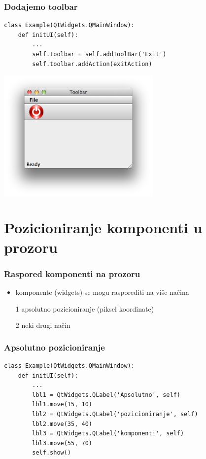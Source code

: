 \documentclass[utf8,compress]{beamer}
\begin{document}
\begin{frame}[fragile]
  \frametitle{Dodajemo toolbar}
\begin{verbatim}
class Example(QtWidgets.QMainWindow):
    def initUI(self):
        ...
        self.toolbar = self.addToolBar('Exit')
        self.toolbar.addAction(exitAction)        
\end{verbatim}
\begin{center}
\includegraphics[width=8cm]{pyqt04.png}
\end{center}
\end{frame}

\section[Pozicioniranje]{Pozicioniranje komponenti u prozoru}

\begin{frame}[fragile]
  \frametitle{Raspored komponenti na prozoru}
  \begin{itemize}
    \item komponente (widgets) se mogu rasporediti na više načina
    \item[1] apsolutno pozicioniranje (piksel koordinate)
    \item[2] neki drugi način
  \end{itemize}
\end{frame}

\begin{frame}[fragile]
  \frametitle{Apsolutno pozicioniranje}
\begin{verbatim}
class Example(QtWidgets.QMainWindow):
    def initUI(self):
        ...
        lbl1 = QtWidgets.QLabel('Apsolutno', self)
        lbl1.move(15, 10)
        lbl2 = QtWidgets.QLabel('pozicioniranje', self)
        lbl2.move(35, 40)
        lbl3 = QtWidgets.QLabel('komponenti', self)
        lbl3.move(55, 70)        
        self.show()
\end{verbatim}
\end{frame}
\end{document}
